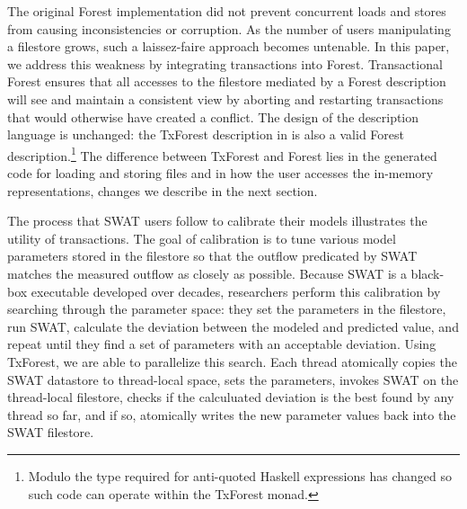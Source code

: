 
The original Forest implementation did not prevent concurrent loads
and stores from causing inconsistencies or corruption.  As the number
of users manipulating a filestore grows, such a laissez-faire approach
becomes untenable.  In this paper, we address this weakness by
integrating transactions into Forest.  Transactional Forest 
ensures that all accesses to the filestore mediated by a Forest
description will see and maintain a consistent view by aborting and
restarting transactions that would otherwise have created a
conflict. The design of the description language is unchanged: the
TxForest description in  is also a valid
Forest description.\footnote{Modulo the type required for anti-quoted
  Haskell expressions has changed so such code can operate within the
  TxForest monad.}  The difference between TxForest and Forest lies
in the generated code for loading and storing files and in how the
user accesses the in-memory representations, changes we
describe in the next section.

The process that SWAT users follow to calibrate their models
illustrates the utility of transactions.  The goal of calibration is
to tune various model parameters stored in the filestore so that the
outflow predicated by SWAT matches the measured outflow as closely as
possible.  Because SWAT is a black-box executable developed over
decades, researchers perform this calibration by searching through the
parameter space: they set the parameters in the filestore, run SWAT,
calculate the deviation between the modeled and predicted value, and
repeat until they find a set of parameters with an acceptable
deviation.  Using TxForest, we are able to parallelize this search.
Each thread atomically copies the SWAT datastore to thread-local
space, sets the parameters, invokes SWAT on the thread-local
filestore, checks if the calculuated deviation is the best found by
any thread so far, and if so, atomically writes the new parameter
values back into the SWAT filestore.



